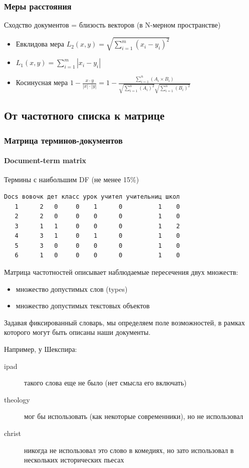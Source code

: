 \documentclass[svgnames]{beamer}
\begin{document}
\begin{frame}
  \frametitle{Меры расстояния}
  Сходство документов = близость векторов (в N-мерном пространстве)
  \begin{itemize}
  \item Евклидова мера $L_2(x,y) = \sqrt{\sum_{i=1}^{m}(x_i-y_i)^2}$
  \item $L_1(x,y) = \sum_{i=1}^{m}|x_i-y_i| $   
  \item Косинусная мера $1-\frac{x\cdot y}{|x|\cdot|y|} = 1 -
    \frac{\sum_{i=1}^{n}(A_i\times B_i)}{\sqrt{\sum_{i=1}^{n}(A_i)^2}\sqrt{\sum_{i=1}^{n}(B_i)^2}}$
  \end{itemize}
\end{frame}


\subsection{От частотного списка к матрице}

\begin{frame}[fragile]
  \frametitle{Матрица терминов-документов}
  \framesubtitle{Document-term matrix}
  Термины с наибольшим DF (не менее 15\%)
  \footnotesize
\begin{verbatim}
Docs вовочк дет класс урок учител учительниц школ
   1      2   0     0    1      0          1    0
   2      2   0     0    0      0          1    0
   3      1   1     0    0      0          1    2
   4      3   1     0    1      0          1    0
   5      3   0     0    0      0          1    0
   6      1   0     0    0      0          1    0
\end{verbatim}
\end{frame}

\begin{frame}[standout]
   Матрица частотностей описывает наблюдаемые пересечения двух
   множеств:
   \begin{itemize}
   \item множество допустимых слов (types)
   \item множество допустимых текстовых объектов
   \end{itemize}
\end{frame}

\begin{frame}
  Задавая фиксированный словарь, мы определяем \alert{поле
    возможностей}, в рамках которого могут быть описаны наши
  документы.

  Например, у Шекспира:

  \begin{description}
  \item[ipad] такого слова еще не было (нет смысла его включать)
  \item[theology] мог бы использовать (как некоторые современники), но
    не использовал
  \item[christ] никогда не использовал это слово в комедиях, но зато
    использовал в нескольких исторических пьесах
  \end{description}
\end{frame}
\end{document}

